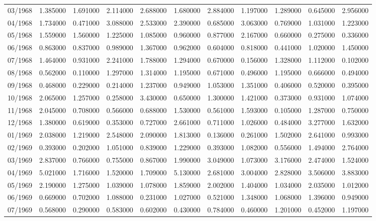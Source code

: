 \begin{tabular}{lrrrrrrrrrr}
03/1968 & 1.385000 & 1.691000 & 2.114000 & 2.688000 & 1.680000 & 2.884000 & 1.197000 & 1.289000 & 0.645000 & 2.956000 \\
04/1968 & 1.734000 & 0.471000 & 3.088000 & 2.533000 & 2.390000 & 0.685000 & 3.063000 & 0.769000 & 1.031000 & 1.223000 \\
05/1968 & 1.559000 & 1.560000 & 1.225000 & 1.085000 & 0.960000 & 0.877000 & 2.167000 & 0.660000 & 0.275000 & 0.336000 \\
06/1968 & 0.863000 & 0.837000 & 0.989000 & 1.367000 & 0.962000 & 0.604000 & 0.818000 & 0.441000 & 1.020000 & 1.450000 \\
07/1968 & 1.464000 & 0.931000 & 2.241000 & 1.788000 & 1.294000 & 0.670000 & 0.156000 & 1.328000 & 1.112000 & 0.102000 \\
08/1968 & 0.562000 & 0.110000 & 1.297000 & 1.314000 & 1.195000 & 0.671000 & 0.496000 & 1.195000 & 0.666000 & 0.494000 \\
09/1968 & 0.468000 & 0.229000 & 0.214000 & 1.237000 & 0.949000 & 1.053000 & 1.351000 & 0.406000 & 0.520000 & 0.395000 \\
10/1968 & 2.065000 & 1.257000 & 0.258000 & 3.430000 & 0.650000 & 1.300000 & 1.421000 & 0.373000 & 0.931000 & 1.074000 \\
11/1968 & 2.045000 & 0.708000 & 0.566000 & 0.688000 & 1.530000 & 0.561000 & 1.593000 & 0.105000 & 1.287000 & 0.750000 \\
12/1968 & 1.380000 & 0.619000 & 0.353000 & 0.727000 & 2.661000 & 0.711000 & 1.026000 & 0.484000 & 3.277000 & 1.632000 \\
01/1969 & 2.038000 & 1.219000 & 2.548000 & 2.090000 & 1.813000 & 0.136000 & 0.261000 & 1.502000 & 2.641000 & 0.993000 \\
02/1969 & 0.393000 & 0.202000 & 1.051000 & 0.839000 & 1.229000 & 0.393000 & 1.082000 & 0.556000 & 1.494000 & 2.764000 \\
03/1969 & 2.837000 & 0.766000 & 0.755000 & 0.867000 & 1.990000 & 3.049000 & 1.073000 & 3.176000 & 2.474000 & 1.524000 \\
04/1969 & 5.021000 & 1.716000 & 1.520000 & 1.709000 & 5.130000 & 2.681000 & 3.004000 & 2.828000 & 3.506000 & 3.883000 \\
05/1969 & 2.190000 & 1.275000 & 1.039000 & 1.078000 & 1.859000 & 2.002000 & 1.404000 & 1.034000 & 2.035000 & 1.012000 \\
06/1969 & 0.669000 & 0.702000 & 1.088000 & 0.231000 & 1.027000 & 0.521000 & 1.348000 & 1.068000 & 1.396000 & 0.949000 \\
07/1969 & 0.568000 & 0.290000 & 0.583000 & 0.602000 & 0.430000 & 0.784000 & 0.460000 & 1.201000 & 0.452000 & 1.197000 \\

\end{tabular}
